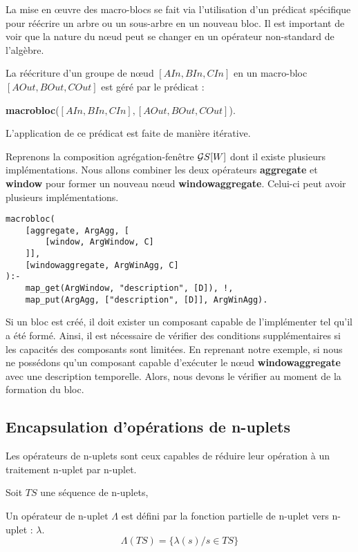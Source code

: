 La mise en œuvre des macro-blocs se fait via l'utilisation d'un prédicat spécifique pour réécrire un arbre ou un sous-arbre en un nouveau bloc. Il est important de voir que la nature du nœud peut se changer en un opérateur non-standard de l'algèbre.
\begin{regle}
La réécriture d'un groupe de nœud $[AIn,BIn,CIn]$ en un macro-bloc $[AOut,BOut,COut]$ est géré par le prédicat :
\begin{center} \textbf{macrobloc}($[AIn,BIn,CIn],[AOut,BOut,COut]$).\end{center}
L'application de ce prédicat est faite de manière itérative.
\end{regle}
\begin{example}
    Reprenons la composition agrégation-fenêtre $\mathcal{G} S[W]$ dont il existe plusieurs implémentations. Nous allons combiner les deux opérateurs \textbf{aggregate} et \textbf{window} pour former un nouveau nœud \textbf{windowaggregate}. Celui-ci peut avoir plusieurs implémentations.
    \begin{lstlisting}
macrobloc(
    [aggregate, ArgAgg, [
        [window, ArgWindow, C]
    ]], 
    [windowaggregate, ArgWinAgg, C]
):-
    map_get(ArgWindow, "description", [D]), !,
    map_put(ArgAgg, ["description", [D]], ArgWinAgg). 
    \end{lstlisting}
\end{example}
Si un bloc est créé, il doit exister un composant capable de l'implémenter tel qu'il a été formé. Ainsi, il est nécessaire de vérifier des conditions supplémentaires si les capacités des composants sont limitées. En reprenant notre exemple, si nous ne possédons qu'un composant capable d'exécuter le nœud \textbf{windowaggregate} avec une description temporelle. Alors, nous devons le vérifier au moment de la formation du bloc.

\subsection{Encapsulation d'opérations de n-uplets}
Les opérateurs de n-uplets sont ceux capables de réduire leur opération à un traitement n-uplet par n-uplet.
\begin{defi}\label{def:operateurtuple}
    Soit $TS$ une séquence de n-uplets,

    Un opérateur de n-uplet $\Lambda$ est défini par la fonction partielle de n-uplet vers n-uplet : $\lambda$.
    $$\Lambda(TS) = \{\lambda(s) / s \in TS \}$$
\end{defi}

